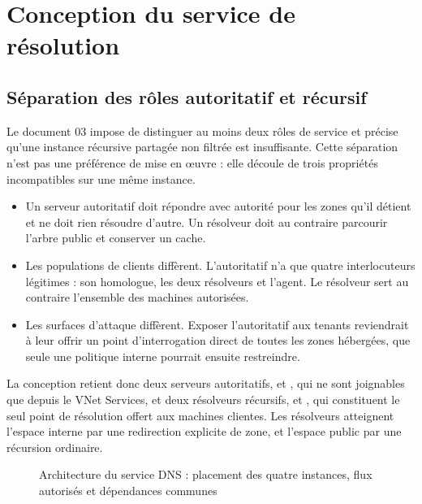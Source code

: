 \chapter{Conception du service de résolution}
\label{ch:conception}

\section{Séparation des rôles autoritatif et récursif}
\label{sec:roles}

Le document 03 impose de distinguer au moins deux rôles de service et précise
qu'une instance récursive partagée non filtrée est insuffisante. Cette
séparation n'est pas une préférence de mise en \oe uvre : elle découle de trois
propriétés incompatibles sur une même instance.

\begin{itemize}
  \item Un serveur autoritatif doit répondre avec autorité pour les zones qu'il
    détient et ne doit rien résoudre d'autre. Un résolveur doit au contraire
    parcourir l'arbre public et conserver un cache.
  \item Les populations de clients diffèrent. L'autoritatif n'a que quatre
    interlocuteurs légitimes : son homologue, les deux résolveurs et l'agent. Le
    résolveur sert au contraire l'ensemble des machines autorisées.
  \item Les surfaces d'attaque diffèrent. Exposer l'autoritatif aux tenants
    reviendrait à leur offrir un point d'interrogation direct de toutes les
    zones hébergées, que seule une politique interne pourrait ensuite
    restreindre.
\end{itemize}

La conception retient donc deux serveurs autoritatifs,  et ,
qui ne sont joignables que depuis le VNet Services, et deux résolveurs
récursifs,  et , qui constituent le seul point de résolution
offert aux machines clientes. Les résolveurs atteignent l'espace interne par une
redirection explicite de zone, et l'espace public par une récursion ordinaire.

\begin{figure}[H]
\centering
\figArchitecture
\caption{Architecture du service DNS : placement des quatre instances, flux
  autorisés et dépendances communes}
\label{fig:architecture}
\end{figure}

